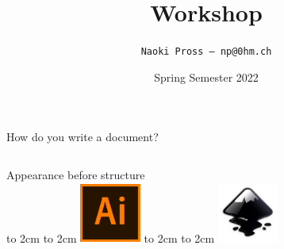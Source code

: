 \documentclass[xetex, onlymath, handout]{beamer}
\title{\textrm{\LaTeXe} Workshop}
\author[NaoPross]{\texttt{Naoki Pross --- np@0hm.ch}}
\date{Spring Semester 2022}
\institute[OST]{OST FHO Campus Rapperswil}
\begin{document}
\frame{
  \maketitle
}

\begin{frame}{How do you write a document?}
\begin{columns}
  \begin{column}{.3\linewidth}
    \begin{center}
      {\large Appearance before structure} \\
      \vspace{1cm}
      \vbox to 2cm {\vfil\hfil \hbox to 2cm {
          \includegraphics[width=2cm]{figs/illustrator-logo}
      } \hfil\vfil }
      \vspace{1cm}
      \vbox to 2cm {\vfil\hfil \hbox to 2cm {
        \includegraphics[width=2cm]{figs/inkscape-logo}
      } \hfil\vfil }
    \end{center}
  \end{column}
  \begin{column}{.3\linewidth}
  \end{column}

\end{columns}
\end{frame}
\end{document}

